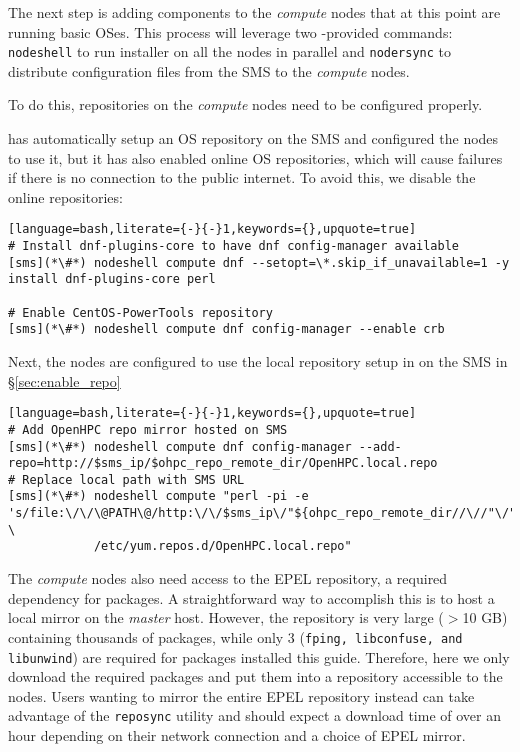 
The next step is adding \OHPC{} components to the {\em compute} nodes that at this
point are running basic OSes.  This process will leverage two \Confluent{}-provided
commands: \texttt{nodeshell} to run \texttt{\pkgmgr{}} installer on all the
nodes in parallel  and \texttt{nodersync} to distribute configuration files from the
SMS to the {\em compute} nodes.

\noindent To do this, repositories on the {\em compute} nodes need to be configured
properly.

\Confluent{} has automatically setup an  OS repository on the SMS and configured the
nodes to use it, but it has  also enabled online OS repositories, which will
cause  \texttt{\pkgmgr{}} failures if there is no connection to the public internet.
To avoid this, we disable the online repositories:

\begin{lstlisting}[language=bash,literate={-}{-}1,keywords={},upquote=true]
# Install dnf-plugins-core to have dnf config-manager available
[sms](*\#*) nodeshell compute dnf --setopt=\*.skip_if_unavailable=1 -y install dnf-plugins-core perl

# Enable CentOS-PowerTools repository
[sms](*\#*) nodeshell compute dnf config-manager --enable crb
\end{lstlisting}

\noindent Next, the nodes are configured to use the local \OHPC{} repository
setup in on the SMS in \S\ref{sec:enable_repo}

\begin{lstlisting}[language=bash,literate={-}{-}1,keywords={},upquote=true]
# Add OpenHPC repo mirror hosted on SMS
[sms](*\#*) nodeshell compute dnf config-manager --add-repo=http://$sms_ip/$ohpc_repo_remote_dir/OpenHPC.local.repo
# Replace local path with SMS URL
[sms](*\#*) nodeshell compute "perl -pi -e 's/file:\/\/\@PATH\@/http:\/\/$sms_ip\/"${ohpc_repo_remote_dir//\//"\/"}"/s' \
            /etc/yum.repos.d/OpenHPC.local.repo"
\end{lstlisting}

The {\em compute} nodes also need access to the EPEL repository, a required
dependency for \OHPC{} packages. A straightforward way to accomplish this is to
host a local mirror on the {\em master} host. However, the repository is very
large ($>$10 GB) containing thousands of packages, while only 3 (\texttt{fping,
libconfuse, and libunwind}) are required for packages installed this guide.  Therefore,
here we only download the required packages and put them into a repository
accessible to the nodes.  Users wanting to mirror the entire EPEL repository
instead can take advantage of the \texttt{reposync} utility and should expect a
download time of over an hour depending on their network connection and a choice
of EPEL mirror.

